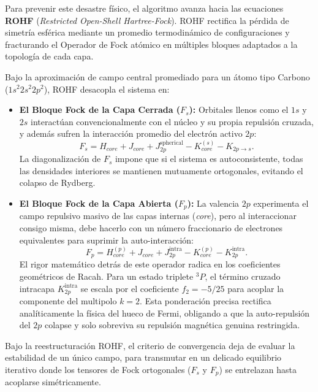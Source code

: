 Para prevenir este desastre físico, el algoritmo avanza hacia las ecuaciones \textbf{ROHF} (\textit{Restricted Open-Shell Hartree-Fock}). ROHF rectifica la pérdida de simetría esférica mediante un promedio termodinámico de configuraciones y fracturando el Operador de Fock atómico en múltiples bloques adaptados a la topología de cada capa. 

Bajo la aproximación de campo central promediado para un átomo tipo Carbono ($1s^2 2s^2 2p^2$), ROHF desacopla el sistema en:

\begin{itemize}
\item \textbf{El Bloque Fock de la Capa Cerrada (\(F_s\)):}
  Orbitales llenos como el $1s$ y $2s$ interactúan convencionalmente con el núcleo y su propia repulsión cruzada, y además sufren la interacción promedio del electrón activo $2p$:
  \begin{equation}
    F_s = H_{core} + J_{core} + J_{2p}^{\text{spherical}} - K_{core}^{(s)} - K_{2p\to s}.
  \end{equation}
  La diagonalización de \( F_s \) impone que si el sistema es autoconsistente, todas las densidades interiores se mantienen mutuamente ortogonales, evitando el colapso de Rydberg.
  
\item \textbf{El Bloque Fock de la Capa Abierta (\(F_p\)):}
  La valencia \( 2p \) experimenta el campo repulsivo masivo de las capas internas (\textit{core}), pero al interaccionar consigo misma, debe hacerlo con un número fraccionario de electrones equivalentes para suprimir la auto-interacción:
  \begin{equation}
    F_p = H_{core}^{(p)} + J_{core} + J_{2p}^{\text{intra}} - K_{core}^{(p)} - K_{2p}^{\text{intra}}.
  \end{equation}
  El rigor matemático detrás de este operador radica en los coeficientes geométricos de Racah. Para un estado triplete $^3P$, el término cruzado intracapa $K_{2p}^{\text{intra}}$ se escala por el coeficiente $f_2 = -5/25$ para acoplar la componente del multipolo $k=2$. Esta ponderación precisa rectifica analíticamente la física del hueco de Fermi, obligando a que la auto-repulsión del $2p$ colapse y solo sobreviva su repulsión magnética genuina restringida.
\end{itemize}

Bajo la reestructuración ROHF, el criterio de convergencia deja de evaluar la estabilidad de un único campo, para transmutar en un delicado equilibrio iterativo donde los tensores de Fock ortogonales ($F_s$ y $F_p$) se entrelazan hasta acoplarse simétricamente.


